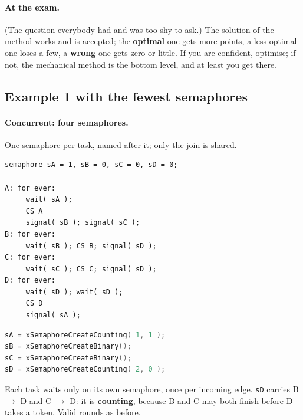 \paragraph{At the exam.} (The question everybody had and was too shy to ask.) The solution of the method works and is accepted; the \textbf{optimal} one gets more points, a less optimal one loses a few, a \textbf{wrong} one gets zero or little. If you are confident, optimise; if not, the mechanical method is the bottom level, and at least you get there.

\subsection{Example 1 with the fewest semaphores}
\paragraph{Concurrent: four semaphores.} One semaphore per task, named after it; only the join is shared.
\par\noindent\begin{minipage}[t]{0.47\textwidth}
\begin{lstlisting}[basicstyle=\ttfamily\scriptsize]
semaphore sA = 1, sB = 0, sC = 0, sD = 0;

A: for ever:
     wait( sA );
     CS A
     signal( sB ); signal( sC );
B: for ever:
     wait( sB ); CS B; signal( sD );
C: for ever:
     wait( sC ); CS C; signal( sD );
D: for ever:
     wait( sD ); wait( sD );
     CS D
     signal( sA );
\end{lstlisting}
\end{minipage}\hfill
\begin{minipage}[t]{0.49\textwidth}
\begin{lstlisting}[language=C, showstringspaces=false, basicstyle=\ttfamily\scriptsize]
sA = xSemaphoreCreateCounting( 1, 1 );
sB = xSemaphoreCreateBinary();
sC = xSemaphoreCreateBinary();
sD = xSemaphoreCreateCounting( 2, 0 );
\end{lstlisting}
\raggedright Each task waits only on its own semaphore, once per incoming edge. \texttt{sD} carries B $\rightarrow$ D and C $\rightarrow$ D: it is \textbf{counting}, because B and C may both finish before D takes a token. Valid rounds as before.
\end{minipage}

